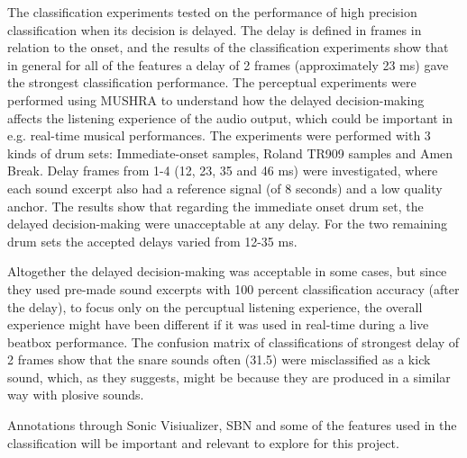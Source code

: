The classification experiments tested on the performance of high precision classification when its decision is delayed.
The delay is defined in frames in relation to the onset, and the results of the classification experiments show that in general for all of the features a delay of 2 frames (approximately 23 ms) gave the strongest classification performance.
The perceptual experiments were performed using MUSHRA to understand how the delayed decision-making affects the listening experience of the audio output, which could be important in e.g. real-time musical performances. The experiments were performed with 3 kinds of drum sets: Immediate-onset samples, Roland TR909 samples and Amen Break. Delay frames from 1-4 (12, 23, 35 and 46 ms) were investigated, where each sound excerpt also had a reference signal (of 8 seconds) and a low quality anchor. The results show that regarding the immediate onset drum set, the delayed decision-making were unacceptable at any delay. For the two remaining drum sets the accepted delays varied from 12-35 ms.

Altogether the delayed decision-making was acceptable in some cases, but since they used pre-made sound excerpts with 100 percent classification accuracy (after the delay), to focus only on the percuptual listening experience, the overall experience might have been different if it was used in real-time during a live beatbox performance. 
The confusion matrix of classifications of strongest delay of 2 frames show that the snare sounds often (31.5) were misclassified as a kick sound, which, as they suggests, might be because they are produced in a similar way with plosive sounds.

Annotations through Sonic Visiualizer, SBN and some of the features used in the classification will be important and relevant to explore for this project.


